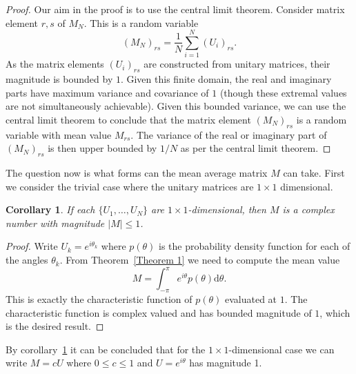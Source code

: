 \documentclass[aps,pra,twocolumn,superscriptaddress,numerical]{revtex4-1}
\newtheorem{corollary}{Corollary}
\begin{document}
\begin{proof}\label{Proof 1}
Our aim in the proof is to use the central limit theorem.  Consider matrix element $r,s$ of $M_N$.  This is a random variable
\begin{equation}
	\left(M_N\right)_{rs} = \frac{1}{N} \sum_{i=1}^N \left(U_i\right)_{rs}.
\end{equation}
As the matrix elements $(U_i)_{rs}$ are constructed from unitary matrices, their magnitude is bounded by $1$.  Given this finite domain, the real and imaginary parts have maximum variance and covariance of $1$ (though these extremal values are not simultaneously achievable).  Given this bounded variance, we can use the central limit theorem to conclude that the matrix element $\left(M_N\right)_{rs}$ is a random variable with mean value $M_{rs}$.
The variance of the real or imaginary part of $(M_N)_{rs}$ is then upper bounded by $1/N$ as per the central limit theorem.
\end{proof}

The question now is what forms can the mean average matrix $M$ can take.   First we consider the trivial case where the unitary matrices are $1 \times 1$ dimensional.

\begin{corollary}
\label{Corollary 1}
	If each $\{U_1,\ldots,U_N\}$ are $1 \times 1$-dimensional, then $M$ is a complex number with magnitude $|M| \leq 1$.
\end{corollary}
\begin{proof}
	Write $U_k = e^{i \theta_k}$ where $p(\theta)$ is the probability density function for each of the angles $\theta_k$. From Theorem~\ref{Theorem 1} we need to compute the mean value 
	\begin{equation}
		M = \int^\pi_{-\pi} e^{i\theta} p(\theta) \mathrm{d}\theta. \label{eq:single parameter, single mode}
	\end{equation}
This is exactly the characteristic function of $p(\theta)$ evaluated at $1$.  The characteristic function is complex valued and has bounded magnitude of $1$, which is the desired result.
\end{proof}

By corollary~\ref{Corollary 1} it can be concluded that for the $1\times1$-dimensional case we can write $M=cU$ where $0 \leq c \leq 1$ and $U=e^{i\theta}$ has magnitude 1.  

\end{document}

